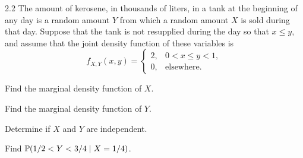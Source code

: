 \documentclass[11pt,oneside]{article}
\begin{document}
\begin{problem}{2.2}
The amount of kerosene, in thousands of liters, in a tank at the beginning of any day is a random amount $Y$ from which a random amount $X$ is sold during that day. Suppose that the tank is not resupplied during the day so that $x\leq y$, and assume that the joint density function of these variables is
\[
    f_{X,Y}(x,y)=
    \begin{cases}
        2, & 0<x\leq y<1,\\
        0, & \text{elsewhere}.
    \end{cases}
\]
\begin{problemsubparts}
    \item Find the marginal density function of $X$.
    \item Find the marginal density function of $Y$.
    \item Determine if $X$ and $Y$ are independent.
    \item Find $\mathbb{P}(1/2<Y<3/4\mid X=1/4)$.
\end{problemsubparts}
\end{problem}
\end{document}
